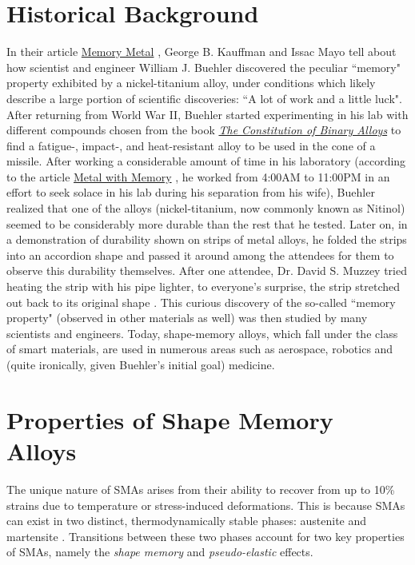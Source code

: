 \begin{multicols}{2}
\section{Historical Background}
In their article \underline{Memory Metal} \cite{kauffman1993memory},  George B. Kauffman and Issac Mayo tell about how scientist and engineer William J. Buehler discovered the peculiar ``memory" property exhibited by a nickel-titanium alloy, under conditions which likely describe a large portion of scientific discoveries: ``A lot of work and a little luck". After returning from World War II, Buehler started experimenting in his lab with different compounds chosen from the book \underline{\textit{The Constitution of Binary Alloys}} to find a fatigue-, impact-, and heat-resistant alloy to be used in the cone of a missile.\cite{kauffman1993memory} After working a considerable amount of time in his laboratory (according to the article \underline{Metal with Memory} \cite{mayometalwithmemory}, he worked from 4:00AM to 11:00PM in an effort to seek solace in his lab during his separation from his wife), Buehler realized that one of the alloys (nickel-titanium, now commonly known as Nitinol) seemed to be considerably more durable than the rest that he tested. Later on, in a demonstration of durability shown on strips of metal alloys, he folded the strips into an accordion shape and passed it around among the attendees for them to observe this durability themselves. After one attendee, Dr. David S. Muzzey tried heating the strip with his pipe lighter, to everyone's surprise, the strip stretched out back to its original shape \cite{kauffman1993memory}. This curious discovery of the so-called ``memory property" (observed in other materials as well) was then studied by many scientists and engineers. Today, shape-memory alloys, which fall under the class of smart materials, are used in numerous areas such as aerospace, robotics and (quite ironically, given Buehler's initial goal) medicine. 

\section{Properties of Shape Memory Alloys}\label{sec:properties}
The unique nature of SMAs arises from their ability to recover from up to 10\% strains due to temperature or stress-induced deformations. This is because SMAs can exist in two distinct, thermodynamically stable phases: austenite and martensite \cite{smith2005smart}. Transitions between these two phases account for two key properties of SMAs, namely the \textit{shape memory} and \textit{pseudo-elastic} effects.


\end{multicols}
